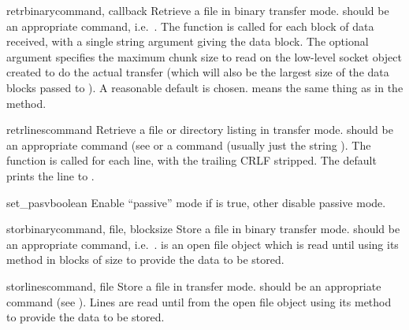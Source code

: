 \begin{methoddesc}{retrbinary}{command,
    callback}
Retrieve a file in binary transfer mode.   should be an
appropriate  command, i.e.\ .
The  function is called for each block of data received,
with a single string argument giving the data block.
The optional  argument specifies the maximum chunk size to
read on the low-level socket object created to do the actual transfer
(which will also be the largest size of the data blocks passed to
).  A reasonable default is chosen.  means the
same thing as in the  method.
\end{methoddesc}

\begin{methoddesc}{retrlines}{command}
Retrieve a file or directory listing in \ASCII{} transfer mode.
 should be an appropriate  command (see
 or a  command (usually just the string
).  The  function is called for each line,
with the trailing CRLF stripped.  The default  prints
the line to .
\end{methoddesc}

\begin{methoddesc}{set_pasv}{boolean}
Enable ``passive'' mode if  is true, other disable
passive mode.
\end{methoddesc}

\begin{methoddesc}{storbinary}{command, file, blocksize}
Store a file in binary transfer mode.   should be an
appropriate  command, i.e.\ .
 is an open file object which is read until \EOF{} using its
 method in blocks of size  to provide the
data to be stored.
\end{methoddesc}

\begin{methoddesc}{storlines}{command, file}
Store a file in \ASCII{} transfer mode.   should be an
appropriate  command (see ).  Lines are
read until \EOF{} from the open file object  using its
 method to provide the data to be stored.
\end{methoddesc}

